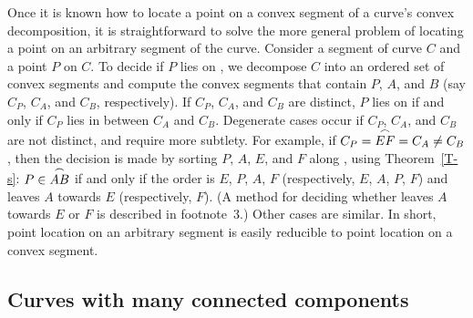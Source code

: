 Once it is known how to locate a point on a convex segment of a curve's
convex decomposition, it is straightforward to solve the more
general problem of locating a point on an arbitrary segment of the curve.
Consider a segment  of curve $C$ and a point $P$ on $C$.
To decide if $P$ lies on , we decompose $C$ into an ordered set of convex
segments and compute the convex segments 
that contain $P$, $A$, and $B$ (say $C_{P}$, $C_{A}$, and $C_{B}$, respectively).
If $C_{P}$, $C_{A}$, and $C_{B}$ are distinct,
$P$ lies on  if and only if $C_{P}$ lies in between $C_{A}$ and $C_{B}$.
Degenerate cases occur if $C_{P}$, $C_{A}$, and $C_{B}$ are not distinct,
and require more subtlety.
For example, if $C_{P} = \mbox{$\stackrel{\frown}{EF}$} = C_{A} \neq C_{B}$,
then the decision is made by sorting $P$, $A$, $E$, and $F$ along , 
using Theorem~\ref{T-s}:
$P \in \mbox{$\stackrel{\frown}{AB}$}$ if and only if the order is $E$, $P$, $A$, $F$ 
(respectively, $E$, $A$, $P$, $F$) and
 leaves $A$ towards $E$ (respectively, $F$).
(A method for deciding whether  leaves $A$ towards $E$ or $F$ 
is described in footnote~3.)
Other cases are similar.
In short, point location on an arbitrary segment is easily reducible to point
location on a convex segment.


\subsection{Curves with many connected components}
\label{sec-cc}

